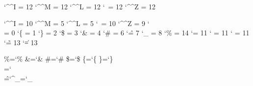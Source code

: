 \startcatcodetable \vrbcatcodes %
    \catcode`\^^I = 12
    \catcode`\^^M = 12
    \catcode`\^^L = 12
    \catcode`\    = 12
    \catcode`\^^Z = 12
\stopcatcodetable

\startcatcodetable \prtcatcodes
    \catcode`\^^I = 10
    \catcode`\^^M =  5
    \catcode`\^^L =  5
    \catcode`\    = 10
    \catcode`\^^Z =  9
    \catcode`\\   =  0
    \catcode`\{   =  1
    \catcode`\}   =  2
    \catcode`\$   =  3
    \catcode`\&   =  4
    \catcode`\#   =  6
    \catcode`\^   =  7
    \catcode`\_   =  8
    \catcode`\%   = 14
    \catcode`\@   = 11
    \catcode`\!   = 11
    \catcode`\?   = 11
    \catcode`\~   = 13
    \catcode`\|   = 13
\stopcatcodetable


\chardef\%=`\%
\chardef\&=`\&
\chardef\#=`\#
\chardef\$=`\$
\chardef\{=`\{
\chardef\}=`\}
\chardef\\=`\\
\chardef\^=`\^
\chardef\_=`\_ %

\def\_{\dontleavehmode \kern.06em \vbox{\hrule width.3em}}


\def\unprotect {\pushcatcodetable\setcatcodetable\prtcatcodes}
\def\protect   {\popcatcodetable}

\endinput
